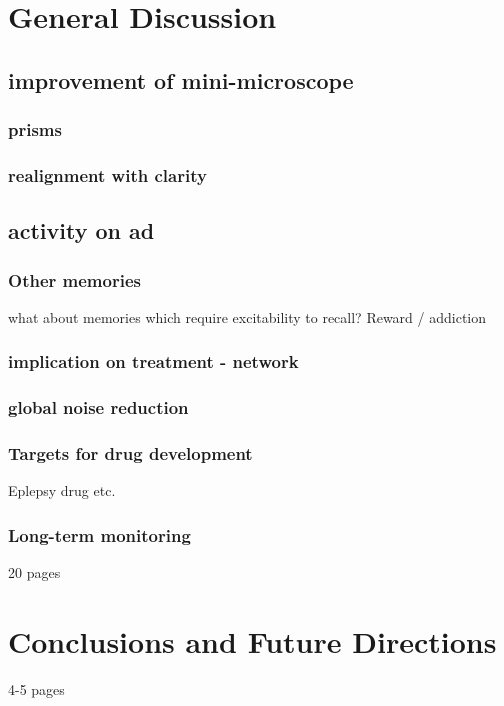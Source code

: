 \chapter{General Discussion}
\section{improvement of mini-microscope}
\subsection{prisms}
\subsection{realignment with clarity}
\section{activity on \gls{ad}}
\subsection{Other memories}
what about memories which require excitability to recall?
Reward / addiction
\subsection{implication on treatment - network}
\subsection{global noise reduction}
\subsection{Targets for drug development}
Eplepsy drug etc.
\subsection{Long-term monitoring}

20 pages

\chapter{Conclusions and Future Directions}
4-5 pages
